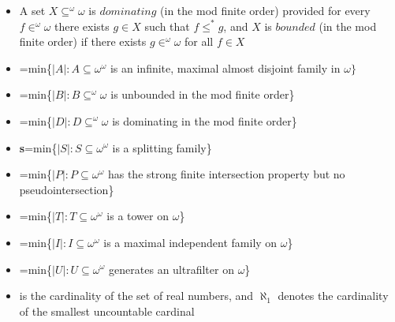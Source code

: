 \documentclass[12pt]{article}
\theoremstyle{definition}
\begin{document}
\begin{itemize}
    \item A set $X\subseteq ^\omega\omega$ is $dominating$ (in the mod finite order) provided for every $f\in ^\omega\omega$ there exists $g\in X$ such that $f\leq^* g$, and $X$ is $bounded$ (in the mod finite order) if there exists $g\in ^\omega\omega$ for all $f\in X$
    \item {}=min\{$|A|:A\subseteq\omega^\omega$ is an infinite, maximal almost disjoint family in $\omega\}$
    \item {}=min\{$|B|:B\subseteq^\omega\omega$ is unbounded in the mod finite order\}
    \item {}=min\{$|D|:D\subseteq^\omega\omega$ is dominating in the mod finite order\}
    \item \textbf{s}=min\{$|S|:S\subseteq\omega^\omega$ is a splitting family\}
    \item {}=min\{$|P|:P\subseteq\omega^\omega$ has the strong finite intersection property but no pseudointersection\}
    \item {}=min\{$|T|:T\subseteq\omega^\omega$ is a tower on $\omega$\}
    \item {}=min\{$|I|:I\subseteq\omega^\omega$ is a maximal independent family on $\omega$\}
    \item {}=min\{$|U|:U\subseteq\omega^\omega$ generates an ultrafilter on $\omega$\}
    \item {} is the cardinality of the set of real numbers, and $\aleph_1$ denotes the cardinality of the smallest uncountable cardinal
\end{itemize}
\end{document}
